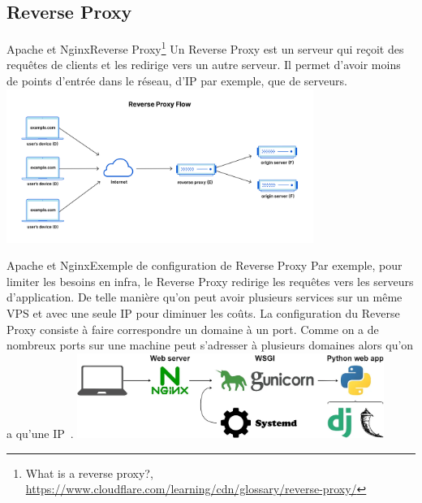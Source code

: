\documentclass{beamer}
\begin{document}
    \subsection{Reverse Proxy}\label{subsec:reverse-proxy}

    \begin{frame}{Apache et Nginx}{Reverse Proxy\footnote{What is a reverse proxy?, \url{https://www.cloudflare.com/learning/cdn/glossary/reverse-proxy/}}}
        Un Reverse Proxy est un serveur qui reçoit des requêtes de clients et les redirige vers un autre serveur.
        Il permet d'avoir moins de points d'entrée dans le réseau, d'IP par exemple, que de serveurs.
        \bigbreak
        \centering
        \includegraphics[width=10cm]{image/reverse-proxy-flow}
    \end{frame}

    \begin{frame}{Apache et Nginx}{Exemple de configuration de Reverse Proxy}
        Par exemple, pour limiter les besoins en infra, le Reverse Proxy redirige les requêtes vers les serveurs d'application.
        De telle manière qu'on peut avoir plusieurs services sur un même VPS et avec une seule IP pour diminuer les coûts.
        \bigbreak
        La configuration du Reverse Proxy consiste à faire correspondre un domaine à un port.
        Comme on a de nombreux ports sur une machine peut s'adresser à plusieurs domaines alors qu'on a qu'une IP~.
        \bigbreak
        \centering
        \includegraphics[width=10cm]{image/flask-gunicorn-nginx}
    \end{frame}
\end{document}
